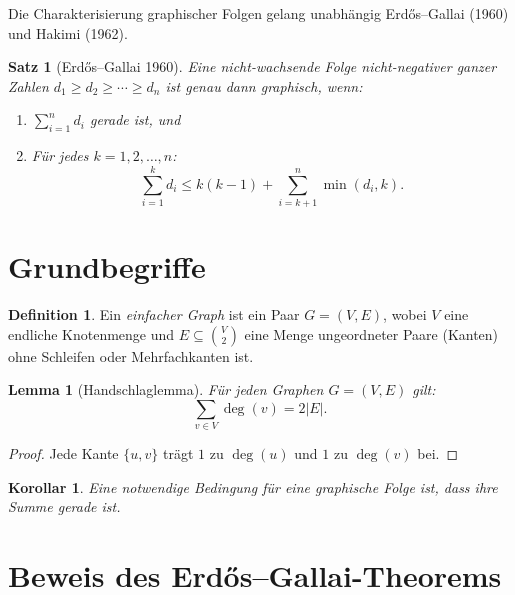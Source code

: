 \documentclass[12pt,a4paper]{amsart}
\newtheorem{lemma}[theorem]{Lemma}
\newtheorem{satz}[theorem]{Satz}
\newtheorem{korollar}[theorem]{Korollar}
\theoremstyle{definition}
\newtheorem{definition_de}[theorem]{Definition}
\theoremstyle{remark}
\begin{document}
Die Charakterisierung graphischer Folgen gelang unabhängig Erd\H{o}s--Gallai (1960)
und Hakimi (1962).

\begin{satz}[Erd\H{o}s--Gallai 1960]
\label{satz:EG}
Eine nicht-wachsende Folge nicht-negativer ganzer Zahlen
$d_1 \geq d_2 \geq \cdots \geq d_n$
ist genau dann graphisch, wenn:
\begin{enumerate}[label=(\roman*)]
  \item $\sum_{i=1}^n d_i$ gerade ist, und
  \item Für jedes $k = 1, 2, \ldots, n$:
        \[
          \sum_{i=1}^k d_i \leq k(k-1) + \sum_{i=k+1}^n \min(d_i, k).
        \]
\end{enumerate}
\end{satz}

\section{Grundbegriffe}

\begin{definition_de}
Ein \emph{einfacher Graph} ist ein Paar $G = (V, E)$, wobei $V$ eine endliche
Knotenmenge und $E \subseteq \binom{V}{2}$ eine Menge ungeordneter Paare (Kanten)
ohne Schleifen oder Mehrfachkanten ist.
\end{definition_de}

\begin{lemma}[Handschlaglemma]
Für jeden Graphen $G = (V, E)$ gilt:
\[
  \sum_{v \in V} \deg(v) = 2|E|.
\]
\end{lemma}

\begin{proof}
Jede Kante $\{u,v\}$ trägt $1$ zu $\deg(u)$ und $1$ zu $\deg(v)$ bei.
\end{proof}

\begin{korollar}
\label{kor:gerade}
Eine notwendige Bedingung für eine graphische Folge ist, dass ihre Summe gerade ist.
\end{korollar}

\section{Beweis des Erd\H{o}s--Gallai-Theorems}
\end{document}
